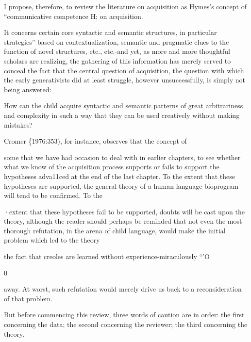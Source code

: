 I propose, therefore, to review the literature on acquisition as
Hymes's concept of ``communicative competence H; on acquisition.

It concerns certain core syntactic and semantic structures, in particular
strategies'' based on contextualization, semantic and pragmatic clues to the function of novel structures, etc., etc.-and yet, as more and more thoughtful scholars are realizing, the gathering of this information has merely served to conceal the fact that the central question of acquisition, the question with which the early generativists did at least struggle, however unsuccessfully, is simply not being answered:

How can the child acquire syntactic and semantic patterns of great arbitrariness and complexity in such a way that they can be used creatively without making mistakes?

Cromer \{1976:353), for instance, observes that the concept of

some that we have had occasion to deal with in earlier chapters, to see whether what we know of the acquisition process supports or fails to support the hypotheses adva11ced at the end of the last chapter. To the extent that these hypotheses are supported, the general theory of a human language bioprogram will tend to be confirmed. To the

·extent that these hypotheses fail to be supported, doubts will be cast upon the theory, although the reader should perhaps be reminded that not even the most thorough refutation, in the arena of child language, would make the initial problem which led to the theory\-

the fact that creoles are learned without experience-miraculously ``'O

0

away. At worst, such refutation would merely drive us back to a
reconsideration of that problem.


But before commencing this review, three words of caution are in order: the first concerning the data; the second concerning the reviewer; the third concerning the theory.


